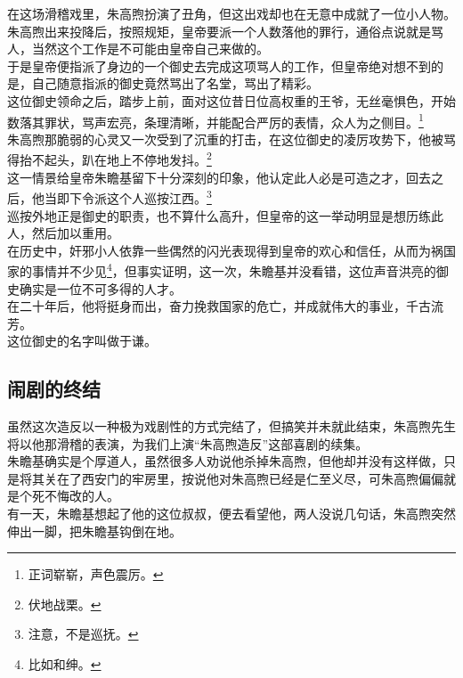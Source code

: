 \begin{multicols}{\theparacolNo}
在这场滑稽戏里，朱高煦扮演了丑角，但这出戏却也在无意中成就了一位小人物。\\

朱高煦出来投降后，按照规矩，皇帝要派一个人数落他的罪行，通俗点说就是骂人，当然这个工作是不可能由皇帝自己来做的。\\

于是皇帝便指派了身边的一个御史去完成这项骂人的工作，但皇帝绝对想不到的是，自己随意指派的御史竟然骂出了名堂，骂出了精彩。\\

这位御史领命之后，踏步上前，面对这位昔日位高权重的王爷，无丝毫惧色，开始数落其罪状，骂声宏亮，条理清晰，并能配合严厉的表情，众人为之侧目。\footnote{正词崭崭，声色震厉。}\\

朱高煦那脆弱的心灵又一次受到了沉重的打击，在这位御史的凌厉攻势下，他被骂得抬不起头，趴在地上不停地发抖。\footnote{伏地战栗。}\\

这一情景给皇帝朱瞻基留下十分深刻的印象，他认定此人必是可造之才，回去之后，他当即下令派这个人巡按江西。\footnote{注意，不是巡抚。}\\

巡按外地正是御史的职责，也不算什么高升，但皇帝的这一举动明显是想历练此人，然后加以重用。\\

在历史中，奸邪小人依靠一些偶然的闪光表现得到皇帝的欢心和信任，从而为祸国家的事情并不少见\footnote{比如和绅。}，但事实证明，这一次，朱瞻基并没看错，这位声音洪亮的御史确实是一位不可多得的人才。\\

在二十年后，他将挺身而出，奋力挽救国家的危亡，并成就伟大的事业，千古流芳。\\

这位御史的名字叫做于谦。\\

\subsection{闹剧的终结}
虽然这次造反以一种极为戏剧性的方式完结了，但搞笑并未就此结束，朱高煦先生将以他那滑稽的表演，为我们上演“朱高煦造反”这部喜剧的续集。\\

朱瞻基确实是个厚道人，虽然很多人劝说他杀掉朱高煦，但他却并没有这样做，只是将其关在了西安门的牢房里，按说他对朱高煦已经是仁至义尽，可朱高煦偏偏就是个死不悔改的人。\\

有一天，朱瞻基想起了他的这位叔叔，便去看望他，两人没说几句话，朱高煦突然伸出一脚，把朱瞻基钩倒在地。\\


\end{multicols}

